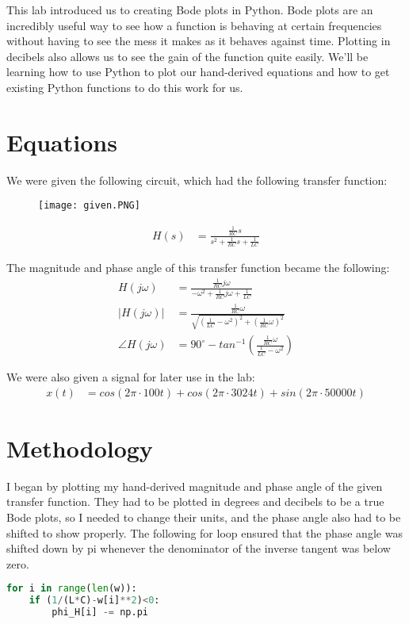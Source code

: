 \documentclass[12pt]{report}
\begin{document}
 This lab introduced us to creating Bode plots in Python. Bode plots are an incredibly useful way to see how a function is behaving at certain frequencies without having to see the mess it makes as it behaves against time. Plotting in decibels also allows us to see the gain of the function quite easily. We'll be learning how to use Python to plot our hand-derived equations and how to get existing Python functions to do this work for us.

\section{Equations}

We were given the following circuit, which had the following transfer function:
\begin{figure}[H]
    \centering
    \texttt{[image: given.PNG]}
\end{figure}
\begin{align*}
    H(s) &= \frac{\frac{1}{RC}s}{s^2+\frac{1}{RC}s+\frac{1}{LC}}
\end{align*}

The magnitude and phase angle of this transfer function became the following:
\begin{align*}
    H(j\omega) &= \frac{\frac{1}{RC}j\omega }{-\omega ^2 +\frac{1}{RC}j\omega +\frac{1}{LC}} \\
    |H(j\omega )| &= \frac{\frac{1}{RC}\omega}{\sqrt{\left(\frac{1}{LC}-\omega^2\right)^2 +\left(\frac{1}{RC}\omega\right)^2}} \\
    \angle H(j\omega) &= 90^{\circ}- tan^{-1}\left(\frac{\frac{1}{RC}\omega}{\frac{1}{LC}-\omega^2}\right)
\end{align*}

We were also given a signal for later use in the lab:
\begin{align*}
    x(t) &= cos(2\pi\cdot100t) + cos(2\pi\cdot3024t) + sin(2\pi\cdot50000t)
\end{align*}

 \section{Methodology}

I began by plotting my hand-derived magnitude and phase angle of the given transfer function. They had to be plotted in degrees and decibels to be a true Bode plots, so I needed to change their units, and the phase angle also had to be shifted to show properly. The following for loop ensured that the phase angle was shifted down by pi whenever the denominator of the inverse tangent was below zero.
\begin{lstlisting}[language=Python]
for i in range(len(w)):
    if (1/(L*C)-w[i]**2)<0:
        phi_H[i] -= np.pi
\end{lstlisting}
\end{document}
